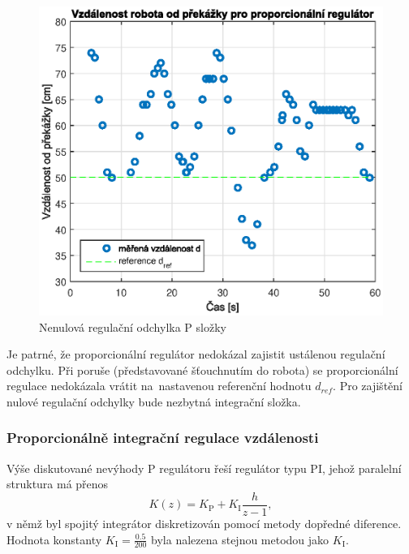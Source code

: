 \documentclass[conference]{IEEEtran}
\begin{document}
\begin{figure}[htbp]
    \centerline{\includegraphics[width=\linewidth]{vzdalenost_od_prekazky_proporcionalni.eps}}
    \caption{Nenulová regulační odchylka P složky}
    \label{fig:vzdalenost_P}        
\end{figure}
Je patrné, že proporcionální regulátor nedokázal zajistit ustálenou regulační odchylku. Při poruše (představované šťouchnutím do robota)
se proporcionální regulace nedokázala vrátit na~nastavenou referenční hodnotu $d_{ref}$.
Pro zajištění nulové regulační odchylky bude nezbytná integrační složka.

\subsubsection{Proporcionálně integrační regulace vzdálenosti}

Výše diskutované nevýhody P regulátoru řeší regulátor typu PI, jehož paralelní struktura má přenos
\begin{equation*}
    K(z) = K_\text{P} + K_\text{I} \frac{h}{z-1},
\end{equation*}
v němž byl spojitý integrátor diskretizován pomocí metody dopředné diference.
Hodnota konstanty $K_\text{I} = \frac{0.5}{200}$ byla nalezena stejnou metodou jako $K_\text{I}$.
\end{document}
